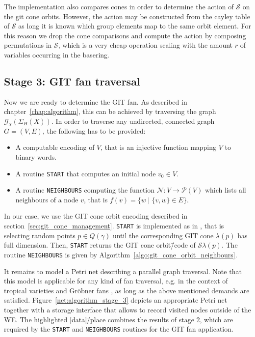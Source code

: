 The \gitfanlib{} implementation also compares cones in order to determine the action of $\mathcal{S}$ on the git cone orbits. However, the action may be constructed from the cayley table of $\mathcal{S}$ as long it is known which group elements map to the same orbit element. For this reason we drop the cone comparisons and compute the action by composing permutations in $\mathcal{S}$, which is a very cheap operation scaling with the amount $r$ of variables occurring in the basering.

\subsection*{Stage 3: GIT fan traversal}

Now we are ready to determine the GIT fan. As described in chapter~\ref{chap:algorithm}, this can be achieved by traversing the graph $\mathcal{G}_\mathcal{S}(\Sigma_H(X))$. In order to traverse any undirected, connected graph $G=(V,E)$, the following has to be provided:

\begin{itemize}
	\item A computable encoding of $V$, that is an injective function mapping $V$ to binary words.
	\item A routine \texttt{START} that computes an initial node $v_0\in V$.
	\item A routine \texttt{NEIGHBOURS} computing the function $\mathcal{N}\colon V \rightarrow \mathcal{P}(V)$ which lists all neighbours of a node $v$, that is $f(v) = \{w \mid \{v,w\}\in E\}$.
\end{itemize}

In our case, we use the GIT cone orbit encoding described in section~\ref{sec:git_cone_management}. \texttt{START} is implemented as in \gitfanlib{}, that is selecting random points $p\in Q(\gamma)$ until the corresponding GIT cone $\lambda(p)$ has full dimension. Then, \texttt{START} returns the GIT cone orbit\=/code of $\mathcal{S}\lambda(p)$. The routine \texttt{NEIGHBOURS} is given by Algorithm~\ref{algo:git_cone_orbit_neighbours}.

It remains to model a Petri net describing a parallel graph traversal. Note that this model is applicable for any kind of fan traversal, e.g. in the context of tropical varieties \cite{tropical_varities} and Gröbner fans \cite[chapter 3]{sturmfels}, as long as the above mentioned demands are satisfied. Figure~\ref{net:algorithm_stage_3} depicts an appropriate Petri net together with a storage interface that allows to record visited nodes outside of the \ac{WE}. The highlighted [data]\=/place combines the results of stage 2, which are required by the \texttt{START} and \texttt{NEIGHBOURS} routines for the GIT fan application.

